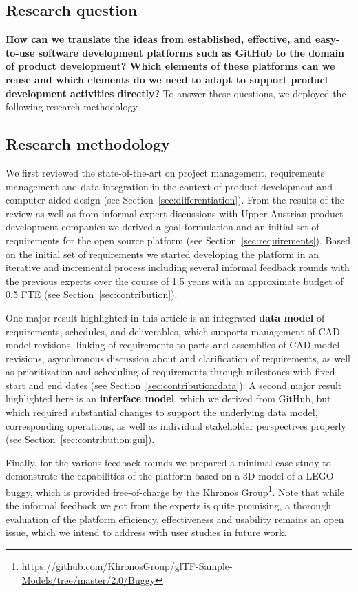 \subsection{Research question}

\textbf{How can we translate the ideas from established, effective, and easy-to-use software development platforms such as GitHub to the domain of product development?
Which elements of these platforms can we reuse and which elements do we need to adapt to support product development activities directly?}
To answer these questions, we deployed the following research methodology.

\subsection{Research methodology}

We first reviewed the state-of-the-art on project management, requirements management and data integration in the context of product development and computer-aided design (see Section~\ref{sec:differentiation}).
From the results of the review as well as from informal expert discussions with Upper Austrian product development companies we derived a goal formulation and an initial set of requirements for the open source platform (see Section~\ref{sec:requirements}).
Based on the initial set of requirements we started developing the platform in an iterative and incremental process including several informal feedback rounds with the previous experts over the course of 1.5 years with an approximate budget of 0.5 FTE (see Section~\ref{sec:contribution}).

One major result highlighted in this article is an integrated \textbf{data model} of requirements, schedules, and deliverables, which supports management of CAD model revisions, linking of requirements to parts and assemblies of CAD model revisions, asynchronous discussion about and clarification of requirements, as well as prioritization and scheduling of requirements through milestones with fixed start and end dates (see Section~\ref{sec:contribution:data}).
A second major result highlighted here is an \textbf{interface model}, which we derived from GitHub, but which required substantial changes to support the underlying data model, corresponding operations, as well as individual stakeholder perspectives properly (see Section~\ref{sec:contribution:gui}).

Finally, for the various feedback rounds we prepared a minimal case study to demonstrate the capabilities of the platform based on a 3D model of a LEGO buggy, which is provided free-of-charge by the Khronos Group\footnote{\url{https://github.com/KhronosGroup/glTF-Sample-Models/tree/master/2.0/Buggy}}.
Note that while the informal feedback we got from the experts is quite promising, a thorough evaluation of the platform efficiency, effectiveness and usability remains an open issue, which we intend to address with user studies in future work.